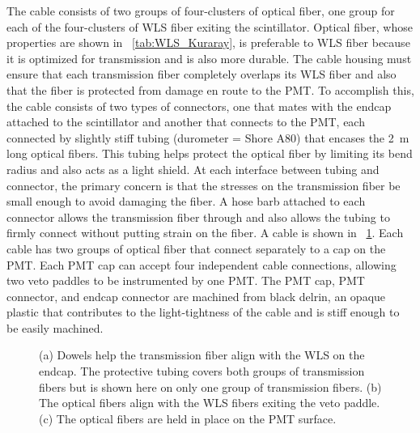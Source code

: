 The cable consists of two groups of four-clusters of optical fiber, one group for each of the four-clusters of WLS fiber exiting the scintillator.  Optical fiber, whose properties are shown in {\tab}~\ref{tab:WLS_Kuraray}, is preferable to WLS fiber because it is optimized for transmission and is also more durable.  The cable housing must ensure that each transmission fiber completely overlaps its WLS fiber and also that the fiber is protected from damage en route to the PMT.  To accomplish this, the cable consists of two types of connectors, one that mates with the endcap attached to the scintillator and another that connects to the PMT, each connected by slightly stiff tubing (durometer = Shore A80) that encases the 2~m long optical fibers.  This tubing helps protect the optical fiber by limiting its bend radius and also acts as a light shield.  At each interface between tubing and connector, the primary concern is that the stresses on the transmission fiber be small enough to avoid damaging the fiber.  A hose barb attached to each connector allows the transmission fiber through and also allows the tubing to firmly connect without putting strain on the fiber.  A cable is shown in {\fig}~\ref{fig:paddleCable}.  Each cable has two groups of optical fiber that connect separately to a cap on the PMT.  Each PMT cap can accept four independent cable connections, allowing two veto paddles to be instrumented by one PMT.  The PMT cap, PMT connector, and endcap connector are machined from black delrin, an opaque plastic that contributes to the light-tightness of the cable and is stiff enough to be easily machined.  
\begin{figure}[!htbp]
\centering
{}
\caption{(a) Dowels help the transmission fiber align with the WLS on the endcap.  The protective tubing covers both groups of transmission fibers but is shown here on only one group of transmission fibers. (b) The optical fibers align with the WLS fibers exiting the veto paddle.  (c) The optical fibers are held in place on the PMT surface.}
\label{fig:paddleCable}
\end{figure}

